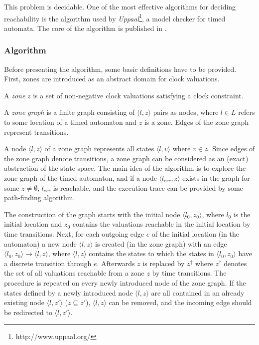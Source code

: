 This problem is decidable. One of the most effective algorithms for deciding reachability is the algorithm used by \emph{Uppaal}\footnote{http://www.uppaal.org/}, a model checker for timed automata. The core of the algorithm is published in \cite{bengtsson2004timed}.
\subsubsection{Algorithm}

Before presenting the algorithm, some basic definitions have to be provided. First, zones are introduced as an abstract domain for clock valuations.

\begin{dfn}
	A \emph{zone} $z$ is a set of non-negative clock valuations satisfying a clock constraint.
\end{dfn}


\begin{dfn}
	A \emph{zone graph} is a finite graph consisting of $\langle l,z \rangle$ pairs as nodes, where $l \in L$ refers to some location of a timed automaton and $z$ is a zone. Edges of the zone graph represent transitions. 
\end{dfn}

A node $\langle l,z \rangle$ of a zone graph represents all states $\langle l,v \rangle$ where $v \in z$. Since edges of the zone graph denote transitions, a zone graph can be considered as an (exact) abstraction of the state space. The main idea of the algorithm is to explore the zone graph of the timed automaton, and if a node $\langle l_{err},z \rangle$ exists in the graph for some $z \neq \emptyset$, $l_{err}$ is reachable, and the execution trace can be provided by some path-finding algorithm.

The construction of the graph starts with the initial node  $\langle l_0,z_0 \rangle$,
where $l_0$ is the initial location and $z_0$ contains the valuations reachable in the initial location by time transitions. 
Next, for each outgoing edge $e$ of the initial location (in the automaton) a new node  $\langle l,z \rangle$ is created (in the zone graph) with an edge
$\langle l_0,z_0 \rangle \to \langle l,z \rangle$, where $\langle l,z \rangle$ contains the states to which the states in $\langle l_0,z_0 \rangle$ have a discrete transition through $e$. Afterwards $z$ is replaced by $z^\uparrow$ where $z^\uparrow$ denotes the set of all valuations reachable from a zone $z$ by time transitions.  The procedure is repeated on every newly introduced node of the zone graph. If the states defined by a newly introduced node $\langle l,z \rangle$ are all contained in an already existing node $\langle l,z' \rangle$ ($z \subseteq z'$), $\langle l,z \rangle$ can be removed, and the incoming edge should be redirected to $\langle l,z' \rangle$.

